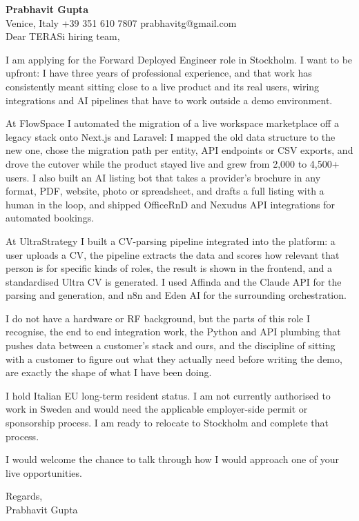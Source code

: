 \documentclass[a4paper,10.5pt]{article}
\begin{document}
\textbf{Prabhavit Gupta}\\
Venice, Italy \textbar{} +39 351 610 7807 \textbar{} prabhavitg@gmail.com\\[10pt]
Dear TERASi hiring team,

I am applying for the Forward Deployed Engineer role in Stockholm. I want to be upfront: I have three years of professional experience, and that work has consistently meant sitting close to a live product and its real users, wiring integrations and AI pipelines that have to work outside a demo environment.

At FlowSpace I automated the migration of a live workspace marketplace off a legacy stack onto Next.js and Laravel: I mapped the old data structure to the new one, chose the migration path per entity, API endpoints or CSV exports, and drove the cutover while the product stayed live and grew from 2,000 to 4,500+ users. I also built an AI listing bot that takes a provider's brochure in any format, PDF, website, photo or spreadsheet, and drafts a full listing with a human in the loop, and shipped OfficeRnD and Nexudus API integrations for automated bookings.

At UltraStrategy I built a CV-parsing pipeline integrated into the platform: a user uploads a CV, the pipeline extracts the data and scores how relevant that person is for specific kinds of roles, the result is shown in the frontend, and a standardised Ultra CV is generated. I used Affinda and the Claude API for the parsing and generation, and n8n and Eden AI for the surrounding orchestration.

I do not have a hardware or RF background, but the parts of this role I recognise, the end to end integration work, the Python and API plumbing that pushes data between a customer's stack and ours, and the discipline of sitting with a customer to figure out what they actually need before writing the demo, are exactly the shape of what I have been doing.

I hold Italian EU long-term resident status. I am not currently authorised to work in Sweden and would need the applicable employer-side permit or sponsorship process. I am ready to relocate to Stockholm and complete that process.

I would welcome the chance to talk through how I would approach one of your live opportunities.

Regards,\\
Prabhavit Gupta
\end{document}

